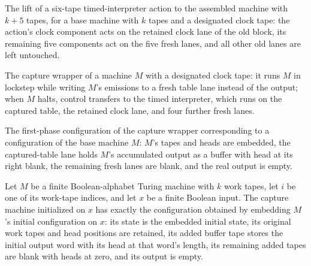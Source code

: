 \begin{definition}
\label{Turing.timedFrameAction}
\leanok
{}
The lift of a six-tape timed-interpreter action to the assembled machine with
$k + 5$ tapes, for a base machine with $k$ tapes and a designated clock tape:
the action's clock component acts on the retained clock lane of the old block,
its remaining five components act on the five fresh lanes, and all other old
lanes are left untouched.
\end{definition}

\begin{definition}
\label{Turing.timedCaptureTM}
\leanok
{}
The capture wrapper of a machine $M$ with a designated clock tape: it runs $M$
in lockstep while writing $M$'s emissions to a fresh table lane instead of the
output; when $M$ halts, control transfers to the timed interpreter, which runs
on the captured table, the retained clock lane, and four further fresh lanes.
\end{definition}

\begin{definition}
\label{Turing.timedCaptureCfg}
\leanok
{}
The first-phase configuration of the capture wrapper corresponding to a
configuration of the base machine $M$: $M$'s tapes and heads are embedded, the
captured-table lane holds $M$'s accumulated output as a buffer with head at
its right blank, the remaining fresh lanes are blank, and the real output is
empty.
\end{definition}

\begin{lemma}
\label{Turing.timedCapture_init}
\leanok
{}
Let $M$ be a finite Boolean-alphabet Turing machine with $k$ work tapes, let $i$ be one
of its work-tape indices, and let $x$ be a finite Boolean input. The capture machine
initialized on $x$ has exactly the configuration obtained by embedding $M$'s initial
configuration on $x$: its state is the embedded initial state, its original work tapes
and head positions are retained, its added buffer tape stores the initial output word
with its head at that word's length, its remaining added tapes are blank with heads at
zero, and its output is empty.
\end{lemma}

